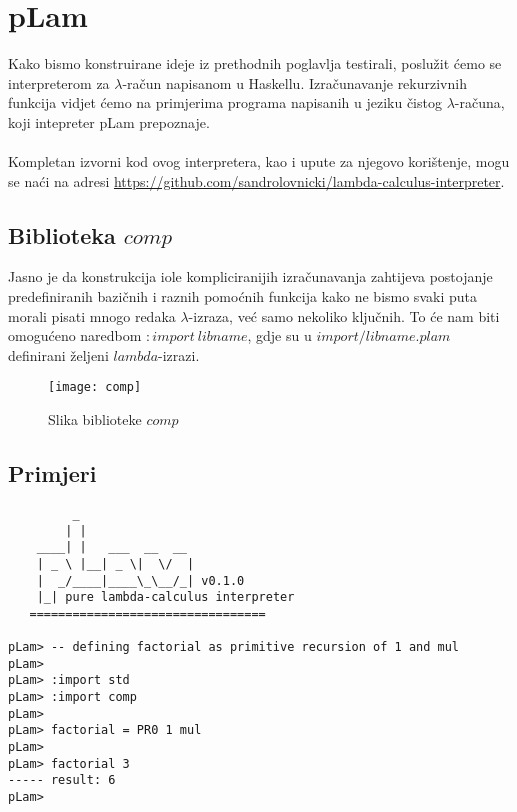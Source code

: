 \documentclass[a4paper,12pt]{article}
\begin{document}
 

\newpage
%
%

\section{pLam}
Kako bismo konstruirane ideje iz prethodnih poglavlja testirali, poslužit ćemo se interpreterom za $\lambda$-račun napisanom u Haskellu. Izračunavanje rekurzivnih funkcija vidjet ćemo na primjerima programa napisanih u jeziku čistog $\lambda$-računa, koji intepreter pLam prepoznaje. \\
\\
Kompletan izvorni kod ovog interpretera, kao i upute za njegovo korištenje, mogu se naći na adresi \href{https://github.com/sandrolovnicki/lambda-calculus-interpreter}{https://github.com/sandrolovnicki/lambda-calculus-interpreter}. 


\subsection{Biblioteka $comp$}
Jasno je da konstrukcija iole kompliciranijih izračunavanja zahtijeva postojanje predefiniranih bazičnih i raznih pomoćnih funkcija kako ne bismo svaki puta morali pisati mnogo redaka $\lambda$-izraza, već samo nekoliko ključnih. To će nam biti omogućeno naredbom $:import\ libname$, gdje su u $import/libname.plam$ definirani željeni $lambda$-izrazi.\\

\begin{figure}[h]
\centering
\texttt{[image: comp]}
\caption{Slika biblioteke $comp$}
\end{figure}


\subsection{Primjeri}

\begin{lstlisting}
         _
        | |
    ____| |   ___  __  __
    | _ \ |__| _ \|  \/  |
    |  _/____|____\_\__/_| v0.1.0
    |_| pure lambda-calculus interpreter
   =================================

pLam> -- defining factorial as primitive recursion of 1 and mul
pLam>
pLam> :import std
pLam> :import comp
pLam> 
pLam> factorial = PR0 1 mul
pLam> 
pLam> factorial 3
----- result: 6
pLam> 

\end{lstlisting}
\end{document}

